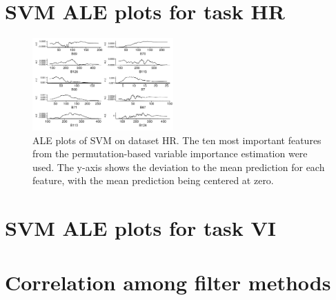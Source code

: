 \documentclass[letterpaper, peerreview, draftcls]{IEEEtran}
\begin{document}
\appendices{}

\section{SVM ALE plots for task HR}

\begin{figure} [ht]
	\begin{center}
		\includegraphics[width=0.48\textwidth] {fi-hr-ale-1.pdf}
		\caption{ALE plots of SVM on dataset HR. The ten most important features from the permutation-based variable importance estimation were used. The y-axis shows the deviation to the mean prediction for each feature, with the mean prediction being centered at zero.}\label{fig:fi-hr-ale}
	\end{center}
\end{figure}

\section{SVM ALE plots for task VI}


\section{Correlation among filter methods}

\pagebreak
\end{document}
